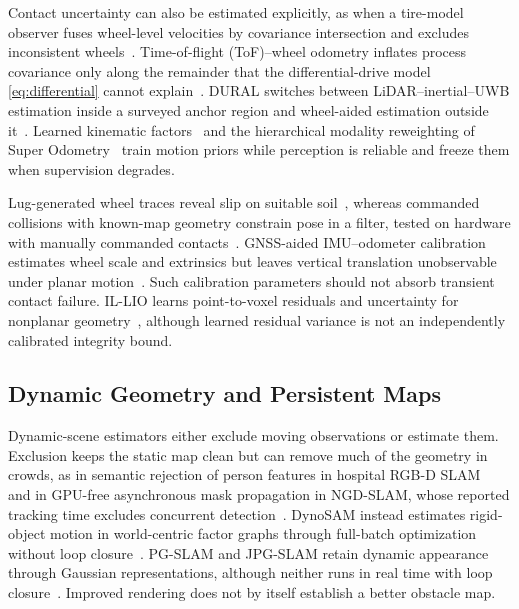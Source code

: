 Contact uncertainty can also be estimated explicitly, as when a tire-model observer fuses wheel-level velocities by covariance intersection and excludes inconsistent wheels~\cite{P_M39}. Time-of-flight (ToF)--wheel odometry inflates process covariance only along the remainder that the differential-drive model \eqref{eq:differential} cannot explain~\cite{P_E02}. DURAL switches between LiDAR--inertial--UWB estimation inside a surveyed anchor region and wheel-aided estimation outside it~\cite{P_E03}. Learned kinematic factors~\cite{P_E04} and the hierarchical modality reweighting of Super Odometry~\cite{P_E07} train motion priors while perception is reliable and freeze them when supervision degrades.

Lug-generated wheel traces reveal slip on suitable soil~\cite{P_N03}, whereas commanded collisions with known-map geometry constrain pose in a filter, tested on hardware with manually commanded contacts~\cite{P_N19}. GNSS-aided IMU--odometer calibration estimates wheel scale and extrinsics but leaves vertical translation unobservable under planar motion~\cite{P_S32}. Such calibration parameters should not absorb transient contact failure. IL-LIO learns point-to-voxel residuals and uncertainty for nonplanar geometry~\cite{P_S30}, although learned residual variance is not an independently calibrated integrity bound.

\subsection{Dynamic Geometry and Persistent Maps}

Dynamic-scene estimators either exclude moving observations or estimate them. Exclusion keeps the static map clean but can remove much of the geometry in crowds, as in semantic rejection of person features in hospital RGB-D SLAM~\cite{P_M44} and in GPU-free asynchronous mask propagation in NGD-SLAM, whose reported tracking time excludes concurrent detection~\cite{P_E19}. DynoSAM instead estimates rigid-object motion in world-centric factor graphs through full-batch optimization without loop closure~\cite{P_E15}. PG-SLAM and JPG-SLAM retain dynamic appearance through Gaussian representations, although neither runs in real time with loop closure~\cite{P_E17,P_E20}. Improved rendering does not by itself establish a better obstacle map.

